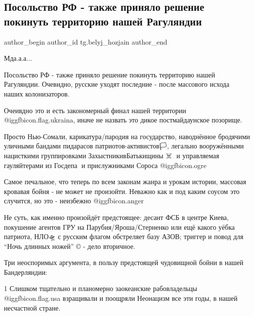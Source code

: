  
 
 
 
 
 
\subsection{Посольство РФ - также приняло решение покинуть территорию нашей Рагуляндии}
\label{sec:12_02_2022.tg.belyj_hozjain.1.posolstvo_rf_raguljandia}
 
\ifcmt
 author_begin
   author_id tg.belyj_hozjain
 author_end
\fi

Мда.а.а...

Посольство РФ - также приняло решение покинуть территорию нашей Рагуляндии.
Очевидно, русские уходят последние - после массового исхода наших
колонизаторов.

Очеивдно это и есть закономерный финал нашей территории
@igg{fbicon.flag.ukraina}, иначе не назвать это дикое постмайдаунское позорище.

Просто Нью-Сомали, карикатура/пародия на государство, наводнённое бродячими
уличными бандами пидарасов патриотов-активистов🏳, легально вооружёнными
нацисткими группировками ЗахыстникивБатькищины ☠ ️  и управляемая гауляйтерами
из Госдепа🗽 и прислужниками Сороса @igg{fbicon.ogre} 

Самое печальное, что теперь по всем законам жанра и урокам истории, массовая
кровавая бойня - не может не произойти.  Неважно как и под каким соусом это
случится, но это - неизбежно @igg{fbicon.anger} 

Не суть, как именно произойдёт предстоящее: десант ФСБ в центре Киева,
покушение агентов ГРУ на Парубия/Яроша/Стерненко или ещё какого уёбка патриота,
НЛО🛸 с русским флагом обстреляет базу АЗОВ; триггер и повод для \enquote{Ночь длинных
ножей} © - дело вторичное.

Три неоспоримых аргумента, в пользу предстоящей чудовищной бойни в нашей
Бандерляндии:

1 Слишком тщательно и планомерно заокеанские рабовладельцы @igg{fbicon.flag.usa} взращивали и
поощряли Неонацизм все эти годы, в нашей несчастной стране.

